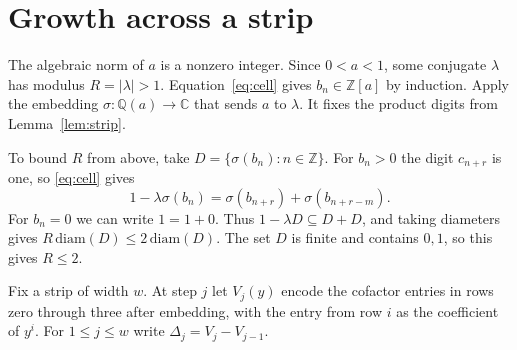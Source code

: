 \documentclass[11pt,reqno]{amsart}
\begin{document}
\section{Growth across a strip}\label{sec:growth}
The algebraic norm of \(a\) is a nonzero integer. Since \(0<a<1\), some conjugate \(\lambda\) has modulus \(R=|\lambda|>1\). Equation~\eqref{eq:cell} gives \(b_n\in\mathbb Z[a]\) by induction. Apply the embedding \(\sigma:\mathbb Q(a)\to\mathbb C\) that sends \(a\) to \(\lambda\). It fixes the product digits from Lemma~\ref{lem:strip}.

To bound \(R\) from above, take \(D=\{\sigma(b_n):n\in\mathbb Z\}\). For \(b_n>0\) the digit \(c_{n+r}\) is one, so \eqref{eq:cell} gives
\[
 1-\lambda\sigma(b_n)=\sigma(b_{n+r})+\sigma(b_{n+r-m}).
\]
For \(b_n=0\) we can write \(1=1+0\). Thus \(1-\lambda D\subseteq D+D\), and taking diameters gives \(R\,\mathrm{diam}(D)\le2\,\mathrm{diam}(D)\). The set \(D\) is finite and contains \(0,1\), so this gives \(R\le2\).

Fix a strip of width \(w\). At step \(j\) let \(V_j(y)\) encode the cofactor entries in rows zero through three after embedding, with the entry from row \(i\) as the coefficient of \(y^i\). For \(1\le j\le w\) write \(\Delta_j=V_j-V_{j-1}\).
\end{document}

